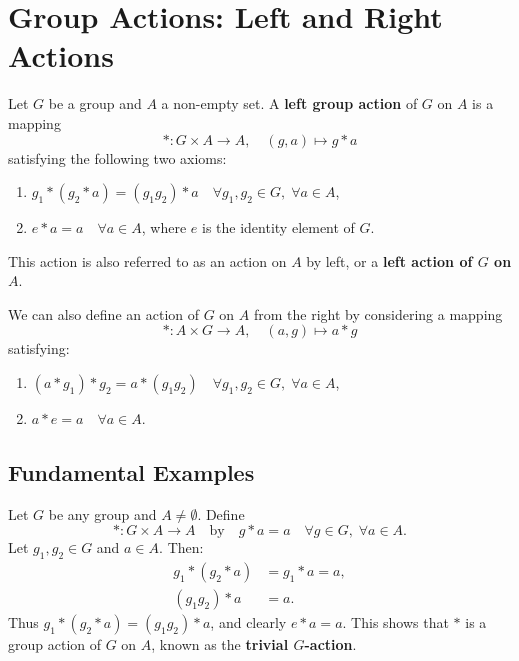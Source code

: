 \section{Group Actions: Left and Right Actions}

\begin{definition}
Let $G$ be a group and $A$ a non-empty set. A \textbf{left group action} of $G$ on $A$ is a mapping
\[
* : G \times A \longrightarrow A, \quad (g, a) \longmapsto g * a
\]
satisfying the following two axioms:
\begin{enumerate}[label=(\roman*)]
    \item $g_1 * (g_2 * a) = (g_1 g_2) * a \quad \forall g_1, g_2 \in G, \; \forall a \in A$,
    \item $e * a = a \quad \forall a \in A$, where $e$ is the identity element of $G$.
\end{enumerate}
This action is also referred to as an action on $A$ by left, or a \textbf{left action of $G$ on $A$}.
\end{definition}

\begin{definition}
We can also define an action of $G$ on $A$ from the right by considering a mapping
\[
* : A \times G \longrightarrow A, \quad (a, g) \longmapsto a * g
\]
satisfying:
\begin{enumerate}[label=(\roman*)]
    \item $(a * g_1) * g_2 = a * (g_1 g_2) \quad \forall g_1, g_2 \in G, \; \forall a \in A$,
    \item $a * e = a \quad \forall a \in A$.
\end{enumerate}
\end{definition}

\subsection{Fundamental Examples}

\begin{example}
Let $G$ be any group and $A \neq \emptyset$. Define
\[
* : G \times A \longrightarrow A \quad \text{by} \quad g * a = a \quad \forall g \in G, \; \forall a \in A.
\]
Let $g_1, g_2 \in G$ and $a \in A$. Then:
\begin{align*}
g_1 * (g_2 * a) &= g_1 * a = a, \\
(g_1 g_2) * a &= a.
\end{align*}
Thus $g_1 * (g_2 * a) = (g_1 g_2) * a$, and clearly $e * a = a$.
This shows that $*$ is a group action of $G$ on $A$, known as the \textbf{trivial $G$-action}.
\end{example}

